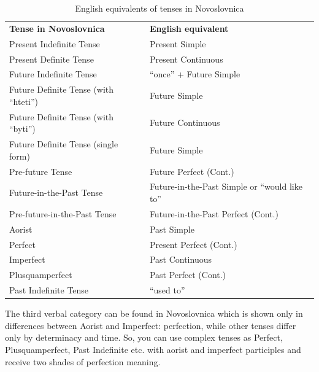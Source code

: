 \begin{table}
	\caption{English equivalents of tenses in Novoslovnica}
	\begin{tabular}{ p{11em} p{11em} }
		\textbf{Tense in Novoslovnica}       & \textbf{English equivalent}                  \\
		Present Indefinite Tense             & Present Simple                               \\
		Present Definite Tense               & Present Continuous                           \\
		Future Indefinite Tense              & “once” + Future Simple                       \\
		Future Definite Tense (with “hteti”) & Future Simple                                \\
		Future Definite Tense (with “byti”)  & Future Continuous                            \\
		Future Definite Tense (single form)  & Future Simple                                \\
		Pre-future Tense                     & Future Perfect (Cont.)                       \\
		Future-in-the-Past Tense             & Future-in-the-Past Simple or “would like to” \\
		Pre-future-in-the-Past Tense         & Future-in-the-Past Perfect (Cont.)           \\
		Aorist                               & Past Simple                                  \\
		Perfect                              & Present Perfect (Cont.)                      \\
		Imperfect                            & Past Continuous                              \\
		Plusquamperfect                      & Past Perfect (Cont.)                         \\
		Past Indefinite Tense                & “used to”                                    
	\end{tabular}
\end{table}

The third verbal category can be found in Novoslovnica which is shown only in differences between Aorist and Imperfect: perfection, while other tenses differ only by determinacy and time. So, you can use complex tenses as Perfect, Plusquamperfect, Past Indefinite etc. with aorist and imperfect participles and receive two shades of perfection meaning.
